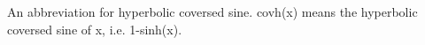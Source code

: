 An abbreviation for hyperbolic coversed sine. covh(x) means the hyperbolic coversed
sine of x, i.e. 1-sinh(x).